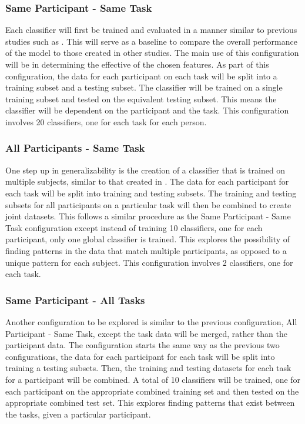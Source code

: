\documentclass[11pt]{artikel3}
\begin{document}
\subsubsection{Same Participant - Same Task}
Each classifier will first be trained and evaluated in a manner similar to previous studies such as \cite{Wilson, Zhang, Wang_R, Yin}. This will serve as a baseline to compare the overall performance of the model to those created in other studies. The main use of this configuration will be in determining the effective of the chosen features. As part of this configuration, the data for each participant on each task will be split into a training subset and a testing subset. The classifier will be trained on a single training subset and tested on the equivalent testing subset. This means the classifier will be dependent on the participant and the task. This configuration involves 20 classifiers, one for each task for each person.

\subsubsection{All Participants - Same Task}
One step up in generalizability is the creation of a classifier that is trained on multiple subjects, similar to that created in \cite{Wang_Z}. The data for each participant for each task will be split into training and testing subsets. The training and testing subsets for all participants on a particular task will then be combined to create joint datasets. This follows a similar procedure as the Same Participant - Same Task configuration except instead of training 10 classifiers, one for each participant, only one global classifier is trained. This explores the possibility of finding patterns in the data that match multiple participants, as opposed to a unique pattern for each subject. This configuration involves 2 classifiers, one for each task.

\subsubsection{Same Participant - All Tasks}
Another configuration to be explored is similar to the previous configuration, All Participant - Same Task, except the task data will be merged, rather than the participant data. The configuration starts the same way as the previous two configurations, the data for each participant for each task will be split into training a testing subsets. Then, the training and testing datasets for each task for a participant will be combined. A total of 10 classifiers will be trained, one for each participant on the appropriate combined training set and then tested on the appropriate combined test set. This explores finding patterns that exist between the tasks, given a particular participant.
\end{document}
